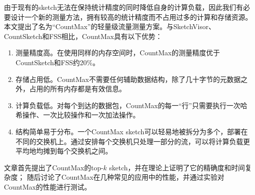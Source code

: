 由于现有的sketch无法在保持统计精度的同时降低自身的计算负载，因此我们有必要设计一个新的测量方法，拥有较高的统计精度而不占用过多的计算和存储资源。
本文提出了名为“CountMax”的轻量级流量测量方案。与SketchVisor、CountSketch和FSS相比，CountMax具有以下优势：
\begin{enumerate}
    \item 测量精度高。在使用同样的内存空间时，CountMax的测量精度优于CountSketch和FSS约20\%。
    \item 存储占用低。CountMax不需要任何辅助数据结构，除了几十字节的元数据之外，占用的所有内存都是有效信息。
    \item 计算负载低。对每个到达的数据包，CountMax的每一“行”只需要执行一次哈希操作、一次比较操作和一次加法操作。
    \item 结构简单易于分布。一个CountMax sketch可以轻易地被拆分为多个，部署在不同的交换机上。通过安排每个交换机只处理一部分的流，可以将计算负载更平均地均摊到每个交换机之间。
\end{enumerate}

文章首先提出了CountMax的top-$k$ sketch，并在理论上证明了它的精确度和时间复杂度；
随后讨论了CountMax在几种常见的应用中的性能，并通过实验对CountMax的性能进行测试。



